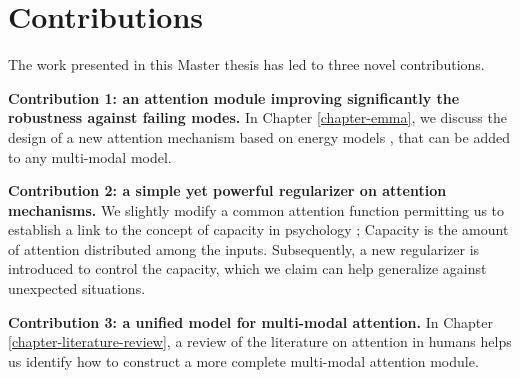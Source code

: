 
\section{Contributions}
The work presented in this Master thesis has led to three novel contributions.
\begin{description}
\item \textbf{Contribution 1: an attention module improving significantly the robustness against failing modes.} In Chapter \ref{chapter-emma}, we discuss the design of a new attention mechanism based on energy models \citep{ebm-tutorial}, that can be added to any multi-modal model. 
\item \textbf{Contribution 2: a simple yet powerful regularizer on attention mechanisms.} We slightly modify a common attention function permitting us to establish a link to the concept of capacity in psychology \citep{attention-is-effort}; Capacity is the amount of attention distributed among the inputs. Subsequently, a new regularizer is introduced to control the capacity, which we claim can help generalize against unexpected situations.
\item \textbf{Contribution 3: a unified model for multi-modal attention.} In Chapter \ref{chapter-literature-review}, a review of the literature on attention in humans helps us identify how to construct a more complete multi-modal attention module.
\end{description}


